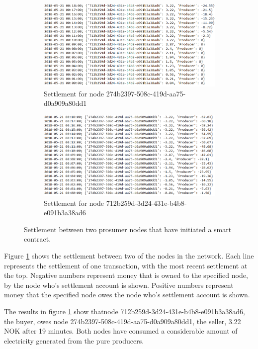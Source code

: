 \begin{figure}
\centering
\begin{subfigure}[!htb]{1\textwidth}
  \includegraphics[width=1\linewidth]{Images/settle_2}
  \caption{Settlement for node 274b2397-508c-419d-aa75-d0a909a80dd1}
\end{subfigure}
\begin{subfigure}[b]{1\textwidth}
  \includegraphics[width=1\linewidth]{Images/settle_7}
  \caption{Settlement for node 712b259d-3d24-431e-b4b8-e091b3a38ad6}
\end{subfigure}
\caption{Settlement between two prosumer nodes that have initiated a smart contract.}
\label{fig:settlement}
\end{figure}

Figure \ref{fig:settlement} shows the settlement between two of the nodes in the network. Each line represents the settlement of one transaction, with the most recent settlement at the top. Negative numbers represent money that is owned to the specified node, by the node who's settlement account is shown. Positive numbers represent money that the specified node owes the node who's settlement account is shown.

The results in figure \ref{fig:settlement} show thatnode 712b259d-3d24-431e-b4b8-e091b3a38ad6, the buyer, owes node 274b2397-508c-419d-aa75-d0a909a80dd1, the seller, 3.22 NOK after 19 minutes. Both nodes have consumed a considerable amount of electricity generated from the pure producers.

